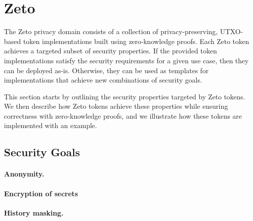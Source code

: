 \section{Zeto}

The Zeto privacy domain consists of a collection of privacy-preserving, UTXO-based token implementations built using zero-knowledge proofs. Each Zeto token achieves a targeted subset of security properties. If the provided token implementations satisfy the security requirements for a given use case, then they can be deployed as-is. Otherwise, they can be used as templates for implementations that achieve new combinations of security goals.

This section starts by outlining the security properties targeted by Zeto tokens. We then describe how Zeto tokens achieve these properties while ensuring correctness with zero-knowledge proofs, and we illustrate how these tokens are implemented with an example.

\subsection{Security Goals}

\paragraph{Anonymity.}


\paragraph{Encryption of secrets} %


\paragraph{History masking.}


